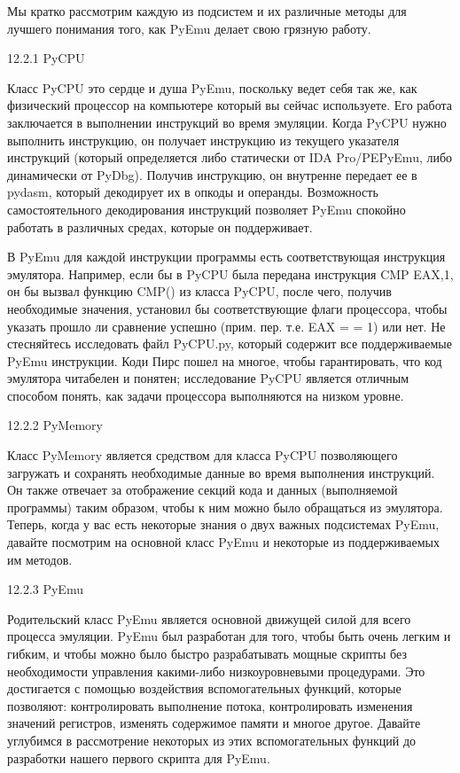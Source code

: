 \documentclass[12pt]{book}
\begin{document}
Мы кратко рассмотрим каждую из подсистем и их различные методы для лучшего понимания того, как PyEmu делает свою грязную работу. 

12.2.1 PyCPU

Класс PyCPU это сердце и душа PyEmu, поскольку ведет себя так же, как физический процессор на компьютере который вы сейчас используете. Его работа заключается в выполнении инструкций во время эмуляции. Когда PyCPU нужно выполнить инструкцию, он получает инструкцию из текущего указателя инструкций (который определяется либо статически от IDA Pro/PEPyEmu, либо динамически от PyDbg). Получив инструкцию, он внутренне передает ее в pydasm, который декодирует их в опкоды и операнды. Возможность самостоятельного декодирования инструкций позволяет PyEmu спокойно работать в различных средах, которые он поддерживает.

В PyEmu для каждой инструкции программы есть соответствующая инструкция эмулятора. Например, если бы в PyCPU была передана инструкция CMP EAX,1, он бы вызвал функцию CMP() из класса PyCPU, после чего, получив необходимые значения, установил бы соответствующие флаги процессора, чтобы указать прошло ли сравнение успешно (прим. пер. т.е. EAX = = 1) или нет. Не стесняйтесь исследовать файл PyCPU.py, который содержит все поддерживаемые PyEmu инструкции. Коди Пирс пошел на многое, чтобы гарантировать, что код эмулятора читабелен и понятен; исследование PyCPU является отличным способом понять, как задачи процессора выполняются на низком уровне.

12.2.2 PyMemory

Класс PyMemory является средством для класса PyCPU позволяющего загружать и сохранять необходимые данные во время выполнения инструкций. Он также отвечает за отображение секций кода и данных (выполняемой программы) таким образом, чтобы к ним можно было обращаться из эмулятора. Теперь, когда у вас есть некоторые знания о двух важных подсистемах PyEmu, давайте посмотрим на основной класс PyEmu и некоторые из поддерживаемых им методов.

12.2.3 PyEmu

Родительский класс PyEmu является основной движущей силой для всего процесса эмуляции. PyEmu был разработан для того, чтобы быть очень легким и гибким, и чтобы можно было быстро разрабатывать мощные скрипты без необходимости управления какими-либо низкоуровневыми процедурами. Это достигается с помощью воздействия вспомогательных функций, которые позволяют: контролировать выполнение потока, контролировать изменения значений регистров, изменять содержимое памяти и многое другое. Давайте углубимся в рассмотрение некоторых из этих вспомогательных функций до разработки нашего первого скрипта для PyEmu.
\end{document}

